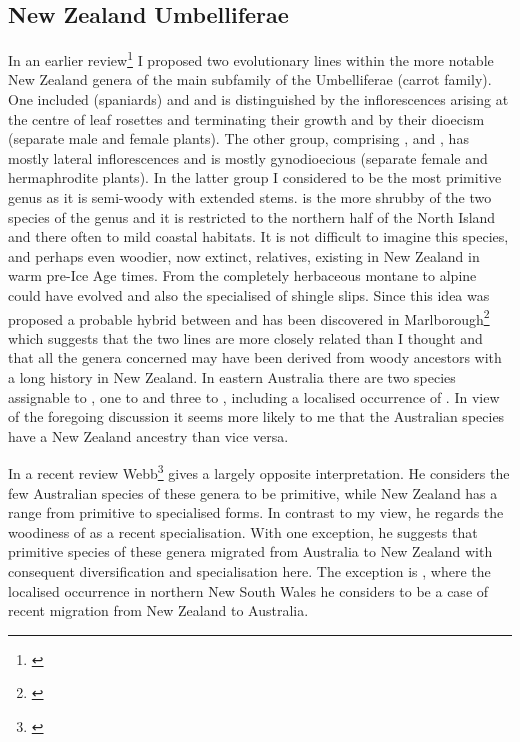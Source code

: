 \subsection{New Zealand Umbelliferae}

In an earlier review\footnote{\cite{dawson1971relationships}} I proposed two evolutionary lines within the more notable New Zealand genera of the main subfamily of the Umbelliferae (carrot family).
One included  (spaniards) and  and is distinguished by the inflorescences arising at the centre of leaf rosettes and terminating their growth and by their dioecism (separate male and female plants).
The other group, comprising ,  and , has mostly lateral inflorescences and is mostly gynodioecious (separate female and hermaphrodite plants).
In the latter group I considered  to be the most primitive genus as it is semi-woody with extended stems.  is the more shrubby of the two species of the genus and it is restricted to the northern half of the North Island and there often to mild coastal habitats.
It is not difficult to imagine this species, and perhaps even woodier, now extinct, relatives, existing in New Zealand in warm pre-Ice Age times.
From  the completely herbaceous montane to alpine  could have evolved and also the specialised  of shingle slips.
Since this idea was proposed a probable hybrid between  and  has been discovered in Marlborough\footnote{\cite{webb1984natural}} which suggests that the two lines are more closely related than I thought and that all the genera concerned may have been derived from woody ancestors with a long history in New Zealand.
In eastern Australia there are two species assignable to , one to  and three to , including a localised occurrence of .
In view of the foregoing discussion it seems more likely to me that the Australian species have a New Zealand ancestry than vice versa.

In a recent review Webb\footnote{\cite{webb1986breeding}} gives a largely opposite interpretation.
He considers the few Australian species of these genera to be primitive, while New Zealand has a range from primitive to specialised forms.
In contrast to my view, he regards the woodiness of  as a recent specialisation.
With one exception, he suggests that primitive species of these genera migrated from Australia to New Zealand with consequent diversification and specialisation here.
The exception is , where the localised occurrence in northern New South Wales he considers to be a case of recent migration from New Zealand to Australia.

